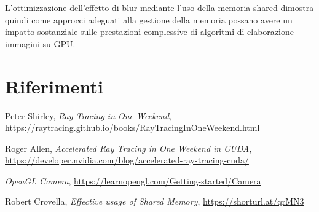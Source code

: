 \documentclass[12pt]{article}
\begin{document}
L'ottimizzazione dell'effetto di blur mediante l'uso della memoria shared dimostra quindi come approcci adeguati alla gestione della memoria possano avere un impatto sostanziale sulle prestazioni complessive di algoritmi di elaborazione immagini su GPU.

\section{Riferimenti}

\begin{thebibliography}{99}
Peter Shirley,
\textit{Ray Tracing in One Weekend},
\url{https://raytracing.github.io/books/RayTracingInOneWeekend.html}

Roger Allen,
\textit{Accelerated Ray Tracing in One Weekend in CUDA},
\url{https://developer.nvidia.com/blog/accelerated-ray-tracing-cuda/}

\textit{OpenGL Camera},
\url{https://learnopengl.com/Getting-started/Camera}

Robert Crovella,
\textit{Effective usage of Shared Memory},
\url{https://shorturl.at/qrMN3}

\end{thebibliography}
\end{document}
